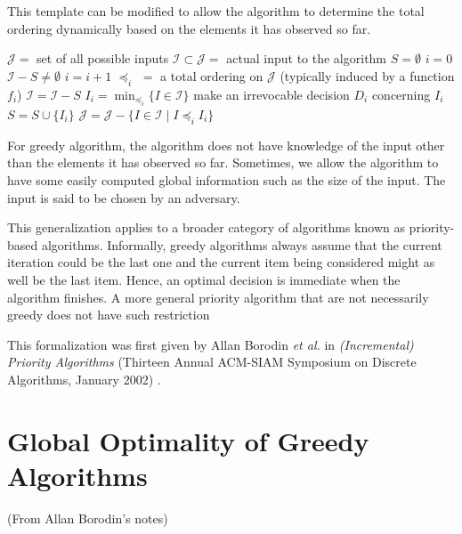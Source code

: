 This template can be modified to allow the algorithm to determine the total ordering dynamically based on the elements it has observed so far.

\begin{codebox}
    \li $\mathcal{J} =$ set of all possible inputs
    \li $\mathcal{I} \subset \mathcal{J} = $ actual input to the algorithm
    \li $S = \emptyset$ 
    \li $i = 0$
    \li \While $\mathcal{I} - S \neq \emptyset$ \Do
        \li $i = i + 1$
        \li $\preceq_i\,\, = $ a total ordering on $\mathcal{J}$ (typically induced by a function $f_i$)
        \li $\mathcal{I} = \mathcal{I} - S$
        \li $I_i = \min_{\preceq_i} \{ I \in \mathcal{I} \}$ 
        \li make an irrevocable decision $D_i$ concerning $I_i$ 
        \li $S = S \cup \{I_i\}$
        \li $\mathcal{J} = \mathcal{J} - \{I \in \mathcal{I} \mid I \preceq_i I_i \}$
    \End      
\end{codebox}

For greedy algorithm, the algorithm does not have knowledge of the input other than the elements it has observed so far. Sometimes, we allow the algorithm to have some easily computed global information such as the size of the input. The input is said to be chosen by an adversary.

This generalization applies to a broader category of algorithms known as priority-based algorithms. Informally, greedy algorithms always assume that the current iteration could be the last one and the current item being considered might as well be the last item. Hence, an optimal decision is immediate when the algorithm finishes. A more general priority algorithm that are not necessarily greedy does not have such restriction

This formalization was first given by Allan Borodin \textit{et al.} in \textit{(Incremental) Priority Algorithms} (Thirteen Annual ACM-SIAM Symposium on Discrete Algorithms, January 2002) \cite{borodin-priority}.

\section{Global Optimality of Greedy Algorithms}

(From Allan Borodin's notes)


